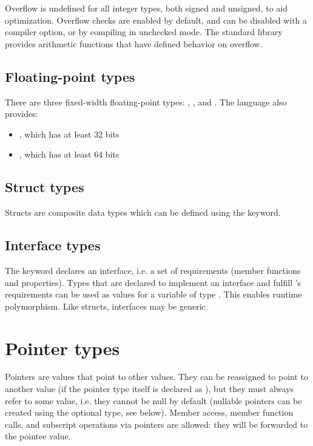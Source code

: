 Overflow is undefined for all integer types, both signed and unsigned, to aid
optimization. Overflow checks are enabled by default, and can be disabled with a
compiler option, or by compiling in unchecked mode. The standard library
provides arithmetic functions that have defined behavior on overflow.

\subsection{Floating-point types}

There are three fixed-width floating-point types: ,
, and . The language also provides:

\begin{itemize}
\item {}, which has at least 32 bits
\item {}, which has at least 64 bits
\end{itemize}

\subsection{Struct types}

Structs are composite data types which can be defined using the 
keyword.

\subsection{Interface types}

The  keyword declares an interface, i.e. a set of requirements
(member functions and properties). Types that are declared to implement an
interface  and fulfill 's requirements can be used as values for
a variable of type . This enables runtime polymorphism. Like structs,
interfaces may be generic.

\section{Pointer types}

Pointers are values that point to other values. They can be reassigned to point
to another value (if the pointer type itself is declared as ), but
they must always refer to some value, i.e. they cannot be null by default
(nullable pointers can be created using the optional type, see below). Member
access, member function calls, and subscript operations via pointers are
allowed: they will be forwarded to the pointee value.


